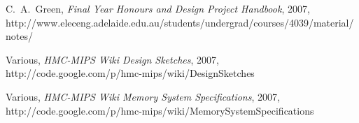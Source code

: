 \documentclass[a4paper,12pt]{article}
\begin{document}
\begin{thebibliography}{99}

 C.~A.~Green, \emph{Final Year Honours and Design
  Project Handbook}, 2007, http://www.eleceng.adelaide.edu.au/students/undergrad/courses/4039/material/notes/

 Various, \emph{HMC-MIPS Wiki Design Sketches},
2007, http://code.google.com/p/hmc-mips/wiki/DesignSketches

 Various, \emph{HMC-MIPS Wiki Memory System Specifications},
2007, http://code.google.com/p/hmc-mips/wiki/MemorySystemSpecifications

\end{thebibliography}

%
%
\end{document}
